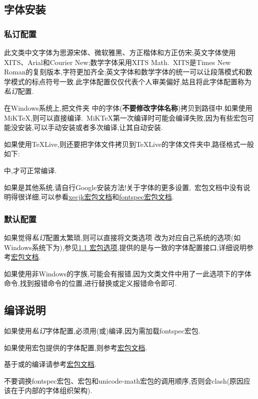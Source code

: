 \documentclass[list,answers,csize4,custom]{sysuexam}
\begin{document}
\subsection{字体安装}
\subsubsection{私订配置}
此文类中文字体为思源宋体、微软雅黑、方正楷体和方正仿宋;英文字体使用XITS、Arial和Courier New;数学字体采用XITS Math.~XITS是Times New Roman的复刻版本,字符更加齐全;英文字体和数学字体的统一可以让段落模式和数学模式的标点符号一致.此字体配置仅仅代表个人审美偏好,姑且将此字体配置称为\textit{私订}配置.

在Windows系统上,把文件夹  中的字体(\textbf{不要修改字体名称})拷贝到路径中.如果使用MiK\TeX{},则可以直接编译.~MiK\TeX{}第一次编译时可能会编译失败,因为有些宏包可能没安装,可以手动安装或者多次编译,让其自动安装.

如果使用\TeX{}Live,则还要把字体文件拷贝到\TeX{}Live的字体文件夹中,路径格式一般如下:\par
{}\par
\noindent 中,才可正常编译.

如果是其他系统,请自行Google安装方法!关于字体的更多设置,~\CTeX{}宏包文档中没有说明得很详细,可以参看\href{http://mirrors.ctan.org/macros/xetex/latex/xecjk/xeCJK.pdf}{xecjk宏包文档}和\href{http://mirrors.ctan.org/macros/unicodetex/latex/fontspec/fontspec.pdf}{fontspec宏包文档}.

\subsubsection{默认配置}
如果觉得\textit{私订}配置太繁琐,则可以直接将文类选项  改为对应自己系统的选项(如Windows系统下为),参见\hyperlink{hbxx}{1.1 宏包选项},提供的是与\CTeX{}一致的字体配置接口,详细说明参考\href{http://mirrors.ctan.org/language/chinese/ctex/ctex.pdf}{\CTeX{}宏包文档}.

如果使用非Windows的字族,可能会有报错,因为文类文件中用了一此选项下的字体命令,找到报错命令的位置,进行替换或定义报错命令即可.

\subsection{编译说明}
\begin{compactitem}
    \item 如果使用\textit{私订}字体配置,必须用(或)编译,因为需加载fontspec宏包.
    \item 如果使用\CTeX{}宏包提供的字体配置,则参考\href{http://mirrors.ctan.org/language/chinese/ctex/ctex.pdf}{\CTeX{}宏包文档}.
    \item 基于或的编译请参考\href{http://mirrors.ctan.org/language/chinese/ctex/ctex.pdf}{\CTeX{}宏包文档}.
    \item 不要调换fontspec宏包、\CTeX{}宏包和unicode-math宏包的调用顺序,否则会clash(原因应该在于内部的字体组织架构).
\end{compactitem}
\end{document}
